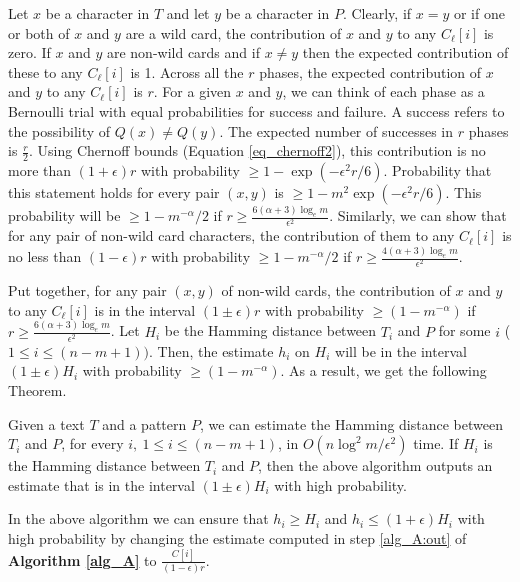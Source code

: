  Let $x$ be a character in $T$  and let $y$ be a
character in $P$. Clearly, if $x=y$ or if one or both of  $x$ and $y$ are a wild
card, the contribution of $x$ and $y$ to any $C_\ell[i]$  is zero. If $x$ and
$y$ are non-wild cards and if $x\neq y$ then the expected  contribution of these
to any $C_\ell[i]$ is 1. Across all the $r$ phases, the  expected contribution
of $x$ and $y$ to any $C_\ell[i]$ is $r$. For a given $x$  and $y$, we can think
of each phase as a Bernoulli trial with equal probabilities  for success and
failure. A success refers to the possibility of $Q(x)\neq Q(y)$.  The expected
number of successes in $r$ phases is $\frac{r}{2}$. Using Chernoff  bounds
(Equation \ref{eq_chernoff2}), this contribution is no more than
$(1+\epsilon)r$ with probability  $\geq 1-\exp(-\epsilon^2r/6)$. Probability that this statement holds  for every pair
$(x,y)$ is $\geq 1-m^2\exp(-\epsilon^2r/6)$. This probability will  be $\geq
1-m^{-\alpha}/2$ if $r\geq \frac{6(\alpha+3)\log_em}{\epsilon^2}$.  Similarly,
we can show that for any pair of non-wild card characters,  the contribution of
them to any $C_\ell[i]$ is no less than $(1-\epsilon)r$ with  probability $\geq
1-m^{-\alpha}/2$ if $r\geq\frac{4(\alpha+3)\log_em}{\epsilon^2}$.

Put together, for any pair $(x,y)$ of non-wild cards, the contribution of $x$
and $y$ to any $C_\ell[i]$ is in the interval $(1\pm\epsilon)r$ with
probability $\geq(1-m^{-\alpha})$ if
$r\geq\frac{6(\alpha+3)\log_em}{\epsilon^2}$. Let $H_i$ be the Hamming distance
between $T_i$ and $P$ for some $i$ ($1\leq i\leq (n-m+1))$. Then, the estimate
$h_i$ on $H_i$ will be in the interval $(1\pm \epsilon)H_i$ with probability
$\geq(1-m^{-\alpha})$. As a result, we get the following Theorem.


\begin{theorem}
Given a text $T$ and a pattern $P$, we can estimate the Hamming distance
between $T_i$ and $P$, for every $i,~1\leq i\leq (n-m+1)$, in 
$O(n\log^2m/\epsilon^2)$ time. If $H_i$ is the Hamming distance between $T_i$
and $P$, then the above algorithm outputs an estimate that is in the interval
$(1\pm\epsilon) H_i$ with high probability.
\end{theorem}


 In the above algorithm we can ensure that $h_i\geq
H_i$ and $h_i\leq(1+\epsilon)H_i$ with high probability by changing the estimate
computed in step \ref{alg_A:out} of {\bf Algorithm \ref{alg_A}} to
$\frac{C[i]}{(1-\epsilon)r}$.


